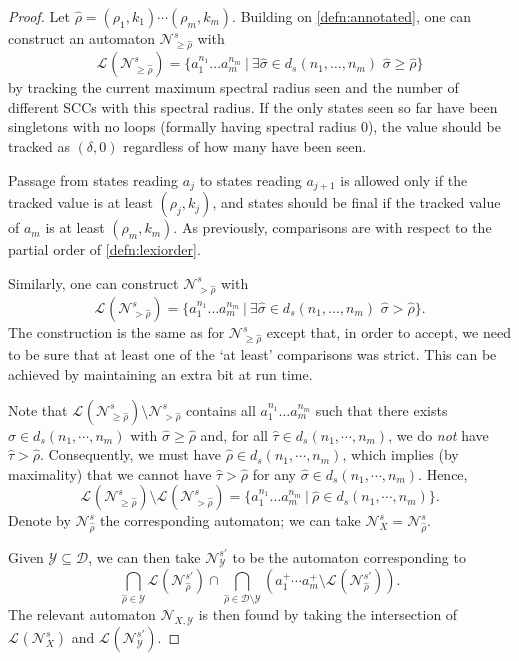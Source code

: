 \documentclass{lmcs}
\theoremstyle{plain}
\theoremstyle{definition}
\theoremstyle{remark}
\newcommand\pbra[1]{\left( #1 \right)}
\newcommand\lng[2]{\mathcal{L}_{#1}(#2)}
\newcommand\dgf{d}
\begin{document}
\begin{proof}
Let $\hat{\rho}=(\rho_1,k_1)\cdots (\rho_m,k_m)$.
Building on \cref{defn:annotated},
one can construct an automaton $\mathcal{N}^s_{{\ge \hat{\rho}}}$ with
\[
  \lng{}{\mathcal{N}^s_{{\ge \hat{\rho}}}} = \{a_1^{n_1} \dots a_m^{n_m}\ |\ { \exists\hat{\sigma} \in \dgf_s(n_1,\dots,n_m)\,\, \hat{\sigma}\ge \hat{\rho} }\}
\]
by tracking the current maximum spectral radius seen and the number of different SCCs with this spectral radius. If the only states seen so far have been singletons with no loops (formally having spectral radius $0$), the value should be tracked as $(\delta,0)$ regardless of how many have been seen.

Passage from states reading $a_j$ to states reading $a_{j+1}$ is allowed only if the tracked value is at least $(\rho_j, k_j)$,
and states should be final if the tracked value of $a_m$ is at least $(\rho_m, k_m)$.
As previously, comparisons are with respect to the partial order of \cref{defn:lexiorder}.

Similarly, one can construct $\mathcal{N}^s_{{>\hat{\rho}}}$ with
\[
  \lng{}{\mathcal{N}^s_{{>\hat{\rho}}}} = \{a_1^{n_1}\dots a_m^{n_m}\ |\ { \exists\hat{\sigma} \in \dgf_s(n_1,\dots,n_m)\,\, \hat{\sigma} > \hat{\rho} }\}.
\]
The construction is the same as for $\mathcal{N}^s_{{\ge \hat{\rho}}}$ except that, in order to accept, we need to be sure that at least
one of the `at least' comparisons was strict. This can be achieved by maintaining an extra bit at run time.

Note that $\lng{}{\mathcal{N}^s_{{\ge \hat{\rho}}}} \setminus \mathcal{N}^s_{{>\hat{\rho}}}$ contains  all $a_1^{n_1} \dots a_m^{n_m}$ such that there exists $\hat{\sigma}\in \dgf_s(n_1,\cdots,n_m)$ with
$\hat{\sigma}\ge \hat{\rho}$ and, for all $\hat{\tau}\in \dgf_s(n_1,\cdots,n_m)$, we do \emph{not} have $\hat{\tau}>\hat{\rho}$. Consequently, we must have $\hat{\rho}\in \dgf_s(n_1,\cdots,n_m)$, which
implies (by maximality) that we cannot have $\hat{\tau} > \hat{\rho}$ for any $\hat{\sigma}\in   \dgf_s(n_1,\cdots,n_m)$. Hence,
\[
\lng{}{\mathcal{N}^s_{{\ge \hat{\rho}}}} \setminus \lng{}{\mathcal{N}^s_{{>\hat{\rho}}}} = \{ a_1^{n_1}\dots a_m^{n_m} \ |\ \hat{\rho}\in \dgf_s(n_1,\cdots,n_m) \}.
\]
Denote by $\mathcal{N}^s_{{\hat{\rho}}}$ the corresponding automaton;
we can take $\mathcal{N}^s_{X} = \mathcal{N}^s_{{\hat{\rho}}}$.

Given $\mathcal{Y}\subseteq \mathcal{D}$, we can then take $\mathcal{N}^{s'}_{\mathcal{Y}}$ to be the automaton corresponding to
\[
\bigcap_{\hat{\rho}\in\mathcal{Y}} \lng{}{\mathcal{N}^{s'}_{{\hat{\rho}}}} \cap \bigcap_{\hat{\rho}\in \mathcal{D}\setminus\mathcal{Y}} \pbra{a_1^+\cdots a_m^+ \setminus \lng{}{\mathcal{N}^{s'}_{{\hat{\rho}}}}}.
\]
The relevant automaton $\mathcal{N}_{X,\mathcal{Y}}$   is then found by taking  the intersection of $\lng{}{\mathcal{N}^s_{{X}}}$ and $\lng{}{\mathcal{N}^{s'}_{\mathcal{Y}}}$.\qedhere
\end{proof}
\end{document}

